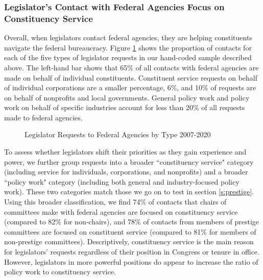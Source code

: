 \documentclass[12pt]{article}
\begin{document}
\subsubsection{Legislator's Contact with Federal Agencies Focus on Constituency Service}
Overall, when legislators contact federal agencies, they are helping constituents navigate the federal bureaucracy. Figure \ref{f:type2} shows the proportion of contacts for each of the five types of legislator requests in our hand-coded sample described above. 
The left-hand bar shows that 65\% of all contacts with federal agencies are made on behalf of individual constituents. Constituent service requests on behalf of individual corporations are a smaller percentage, 6\%, and 10\% of requests are on behalf of nonprofits and local governments. General policy work and policy work on behalf of specific industries account for less than 20\% of all requests made to federal agencies.  


\begin{figure}[hbt!]
\centering
\caption{Legislator Requests to Federal Agencies by Type 2007-2020} \label{f:type2}
\end{figure}



To assess whether legislators shift their priorities as they gain experience and power, we further group requests into a broader ``constituency service"  category (including service for individuals, corporations, and nonprofits) and a broader ``policy work" category (including both general and industry-focused policy work). These two categories match those we go on to test in section \ref{s:prestige}. 
Using this broader classification, we find 74\% of contacts that chairs of committees make with federal agencies are focused on constituency service (compared to 82\% for non-chairs), and 78\% of contacts from members of prestige committees are focused on constituent service (compared to 81\% for members of non-prestige committees).
Descriptively, constituency service is the main reason for legislators' requests regardless of their position in Congress or tenure in office. However, legislators in more powerful positions do appear to increase the ratio of policy work to constituency service.  
\end{document}
